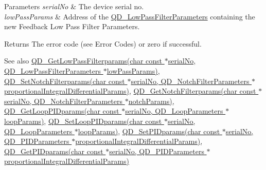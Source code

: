 \begin{DoxyParams}{Parameters}
{\em serial\+No} & The device serial no. \\
\hline
{\em low\+Pass\+Params} & Address of the \hyperlink{struct_q_d___low_pass_filter_parameters}{Q\+D\+\_\+\+Low\+Pass\+Filter\+Parameters} containing the new Feedback Low Pass Filter Parameters. \\
\hline
\end{DoxyParams}
\begin{DoxyReturn}{Returns}
The error code (see Error Codes) or zero if successful. 
\end{DoxyReturn}
\begin{DoxySeeAlso}{See also}
\hyperlink{group___t_cube_quad_ga698c72e36ea50417955b08b69215fcf5}{Q\+D\+\_\+\+Get\+Low\+Pass\+Filterparams(char const $\ast$serial\+No, Q\+D\+\_\+\+Low\+Pass\+Filter\+Parameters $\ast$low\+Pass\+Params)}, \hyperlink{group___t_cube_quad_ga00572c166108d5bd60ed0ab5eae7d83c}{Q\+D\+\_\+\+Set\+Notch\+Filterparams(char const $\ast$serial\+No, Q\+D\+\_\+\+Notch\+Filter\+Parameters $\ast$proportional\+Integral\+Differential\+Params)}, \hyperlink{group___t_cube_quad_ga5132ce023e2c0248a42cb5cdf0a95c3e}{Q\+D\+\_\+\+Get\+Notch\+Filterparams(char const $\ast$serial\+No, Q\+D\+\_\+\+Notch\+Filter\+Parameters $\ast$notch\+Params)}, \hyperlink{group___t_cube_quad_ga9dfc01ca4b37b2f0c662b8d8def06e73}{Q\+D\+\_\+\+Get\+Loop\+P\+I\+Dparams(char const $\ast$serial\+No, Q\+D\+\_\+\+Loop\+Parameters $\ast$loop\+Params)}, \hyperlink{group___t_cube_quad_gad75ed2cff04b2d218326841b2553af0a}{Q\+D\+\_\+\+Set\+Loop\+P\+I\+Dparams(char const $\ast$serial\+No, Q\+D\+\_\+\+Loop\+Parameters $\ast$loop\+Params)}, \hyperlink{group___t_cube_quad_gac4cc242d12537c25f48b86e73138c3d1}{Q\+D\+\_\+\+Set\+P\+I\+Dparams(char const $\ast$serial\+No, Q\+D\+\_\+\+P\+I\+D\+Parameters $\ast$proportional\+Integral\+Differential\+Params)}, \hyperlink{group___t_cube_quad_ga2e1be6be7d8bb5c822766a44205889ae}{Q\+D\+\_\+\+Get\+P\+I\+Dparams(char const $\ast$serial\+No, Q\+D\+\_\+\+P\+I\+D\+Parameters $\ast$proportional\+Integral\+Differential\+Params)}


\end{DoxySeeAlso}
